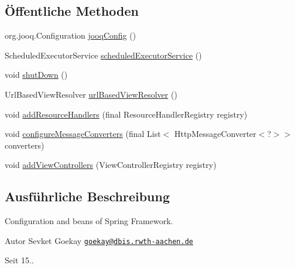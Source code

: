 \subsection*{Öffentliche Methoden}
\begin{DoxyCompactItemize}
\item 
org.\-jooq.\-Configuration \hyperlink{classde_1_1rwth_1_1idsg_1_1steve_1_1config_1_1_bean_configuration_af8c6e00b0a3eaca1b3243a3671c57d86}{jooq\-Config} ()
\item 
Scheduled\-Executor\-Service \hyperlink{classde_1_1rwth_1_1idsg_1_1steve_1_1config_1_1_bean_configuration_ad83cfa068130f9897a79c4f837bbc392}{scheduled\-Executor\-Service} ()
\item 
void \hyperlink{classde_1_1rwth_1_1idsg_1_1steve_1_1config_1_1_bean_configuration_a515e3539c5ac8462c2189b3443c4bcfc}{shut\-Down} ()
\item 
Url\-Based\-View\-Resolver \hyperlink{classde_1_1rwth_1_1idsg_1_1steve_1_1config_1_1_bean_configuration_a369946acce0d10bc3688fc832e7e2eb3}{url\-Based\-View\-Resolver} ()
\item 
void \hyperlink{classde_1_1rwth_1_1idsg_1_1steve_1_1config_1_1_bean_configuration_aeb98d607f6be74df675aaaf0c23d1ddf}{add\-Resource\-Handlers} (final Resource\-Handler\-Registry registry)
\item 
void \hyperlink{classde_1_1rwth_1_1idsg_1_1steve_1_1config_1_1_bean_configuration_a4909e2ea2b160fbb8033b6f3609abf93}{configure\-Message\-Converters} (final List$<$ Http\-Message\-Converter$<$?$>$$>$ converters)
\item 
void \hyperlink{classde_1_1rwth_1_1idsg_1_1steve_1_1config_1_1_bean_configuration_ae182e8c9016e8132bfd20d6326b3f42d}{add\-View\-Controllers} (View\-Controller\-Registry registry)
\end{DoxyCompactItemize}


\subsection{Ausführliche Beschreibung}
Configuration and beans of Spring Framework.

\begin{DoxyAuthor}{Autor}
Sevket Goekay \href{mailto:goekay@dbis.rwth-aachen.de}{\tt goekay@dbis.\-rwth-\/aachen.\-de} 
\end{DoxyAuthor}
\begin{DoxySince}{Seit}
15.. 
\end{DoxySince}


